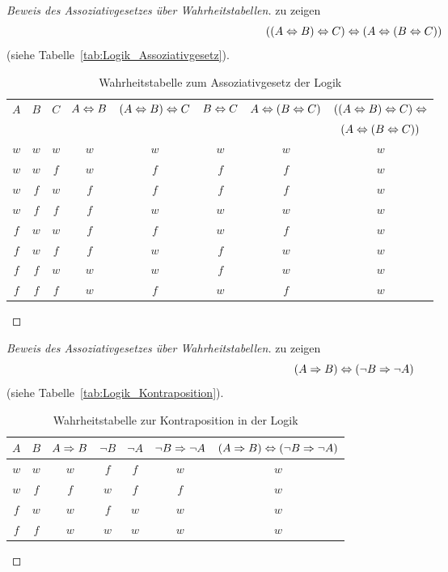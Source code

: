 \begin{proof}[Beweis des Assoziativgesetzes über Wahrheitstabellen]
zu zeigen \[\left(\left(A \Leftrightarrow B\right) \Leftrightarrow C\right) \Leftrightarrow \left(A \Leftrightarrow \left(B \Leftrightarrow C\right)\right)\] (siehe Tabelle~\vref{tab:Logik_Assoziativgesetz}).
\begin{table}[htb]
\center
\begin{tabular}{c|c|c||c|c|c|c||c}
$A$ & $B$ & $C$ & $A \Leftrightarrow B$ & $\left(A \Leftrightarrow B\right) \Leftrightarrow C$ & $B \Leftrightarrow C$ & $A \Leftrightarrow \left(B \Leftrightarrow C\right)$ & \small{$\left(\left(A \Leftrightarrow B\right) \Leftrightarrow C\right) \Leftrightarrow$}\\
&&&&&&& $\left(A \Leftrightarrow \left(B \Leftrightarrow C\right)\right)$\\\hline
$w$ & $w$ & $w$ & $w$ & $w$ & $w$ & $w$ & $w$\\
$w$ & $w$ & $f$ & $w$ & $f$ & $f$ & $f$ & $w$\\
$w$ & $f$ & $w$ & $f$ & $f$ & $f$ & $f$ & $w$\\
$w$ & $f$ & $f$ & $f$ & $w$ & $w$ & $w$ & $w$\\\hline
$f$ & $w$ & $w$ & $f$ & $f$ & $w$ & $f$ & $w$\\
$f$ & $w$ & $f$ & $f$ & $w$ & $f$ & $w$ & $w$\\
$f$ & $f$ & $w$ & $w$ & $w$ & $f$ & $w$ & $w$\\
$f$ & $f$ & $f$ & $w$ & $f$ & $w$ & $f$ & $w$
\end{tabular}
\caption{Wahrheitstabelle zum Assoziativgesetz der Logik}
\label{tab:Logik_Assoziativgesetz}
\end{table}
\end{proof}

\begin{proof}[Beweis des Assoziativgesetzes über Wahrheitstabellen]
zu zeigen \[\left(A \Rightarrow B\right) \Leftrightarrow \left(\neg B \Rightarrow \neg A\right)\] (siehe Tabelle~\vref{tab:Logik_Kontraposition}).
\begin{table}[htb]
\center
\begin{tabular}{c|c||c||c|c|c||c}
$A$ & $B$ & $A \Rightarrow B$ & $\neg B$ & $\neg A$ & $\neg B \Rightarrow \neg A$ & $\left(A \Rightarrow B\right) \Leftrightarrow \left(\neg B \Rightarrow \neg A\right)$\\\hline
$w$ & $w$ & $w$ & $f$ & $f$ & $w$ & $w$\\
$w$ & $f$ & $f$ & $w$ & $f$ & $f$ & $w$\\
$f$ & $w$ & $w$ & $f$ & $w$ & $w$ & $w$\\
$f$ & $f$ & $w$ & $w$ & $w$ & $w$ & $w$
\end{tabular}
\caption{Wahrheitstabelle zur Kontraposition in der Logik}
\label{tab:Logik_Kontraposition}
\end{table}
\end{proof}

